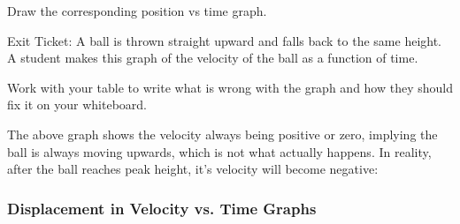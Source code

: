 \documentclass[]{exam}
\begin{document}
\begin{questions}
Draw the corresponding position vs time graph.



\question 
Exit Ticket: A ball is thrown straight upward and falls back to the same height. A student makes this graph of the velocity of the ball as a function of time. 

\begin{center}
\end{center}

Work with your table to write what is wrong with the graph and how they should fix it on your whiteboard.

\begin{solution}
    The above graph shows the velocity always being positive or zero, implying the ball is always moving upwards, which is not what actually happens. In reality, after the ball reaches peak height, it's velocity will become negative:

    \begin{center}
    \end{center}    
\end{solution}

\end{questions}


\clearpage

\subsubsection*{Displacement in Velocity vs. Time Graphs}
\end{document}
